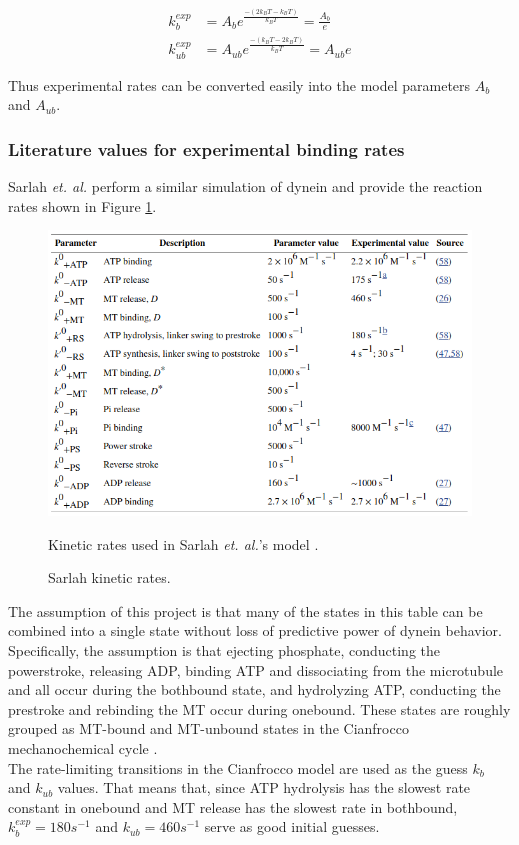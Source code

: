 \documentclass[10pt]{article} %
\begin{document}
\begin{align*}
  k_b^{exp} &= A_be^{\frac{-\left(2k_BT - k_BT\right)}{k_BT}} = \frac{A_b}{e}\\
  k_{ub}^{exp} &= A_{ub}e^{\frac{-\left(k_BT-2k_BT\right)}{k_BT}} = A_{ub}e
\end{align*}

Thus experimental rates can be converted easily into the model parameters $A_b$ and $A_{ub}$.

\subsubsection{Literature values for experimental binding rates}
Sarlah \textit{et. al.} \cite{sarlahmodel} perform a similar simulation of dynein and provide the reaction rates shown in Figure \ref{fig:sarlah-rate-table}.

\begin{figure}[h]
  \centering
  \includegraphics[width=.45\textwidth]{../../figures/SarlahParameterTable.png}
  \caption{Sarlah kinetic rates.}{Kinetic rates used in Sarlah \textit{et. al.}'s model \cite{sarlahmodel}.}
  \label{fig:sarlah-rate-table}
\end{figure}

The assumption of this project is that many of the states in this table can be combined into a single state without loss of predictive power of dynein behavior. Specifically, the assumption is that ejecting phosphate, conducting the powerstroke, releasing ADP, binding ATP and dissociating from the microtubule and all occur during the bothbound state, and hydrolyzing ATP, conducting the prestroke and rebinding the MT occur during onebound. These states are roughly grouped as MT-bound and MT-unbound states in the Cianfrocco mechanochemical cycle \cite{cianfroccoreview}.\\

The rate-limiting transitions in the Cianfrocco model are used as the guess $k_b$ and $k_{ub}$ values. That means that, since ATP hydrolysis has the slowest rate constant in onebound and MT release has the slowest rate in bothbound, $k_b^{exp} = 180 s^{-1}$ and $k_{ub} = 460 s^{-1}$ serve as good initial guesses.\\
\end{document}
